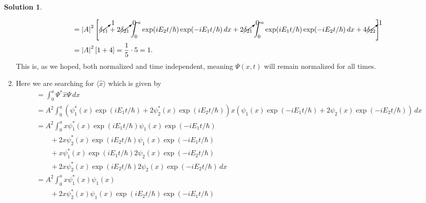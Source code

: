 \documentclass[10pt]{article}
\theoremstyle{definition}
\newtheorem{soln}{Solution}
\begin{document}
\begin{soln}
\begin{enumerate}[label=(\alph*)]
\begin{align*}
             & =\abs{A}^2\left[
              \cancelto{1}{\delta_{11}}
              +2\cancelto{0}{\delta_{21}}\int_{0}^{a}\exp(iE_2t/\hbar)\exp(-iE_1t/\hbar)\,dx
              +2\cancelto{0}{\delta_{21}}\int_{0}^{a}\exp(iE_1t/\hbar)\exp(-iE_2t/\hbar)\,dx
            +4\cancelto{1}{\delta_{22}}\right]                                                                                                                       \\
             & =\abs{A}^2\left[1+4\right]=\frac{1}{5}\cdot 5=1.
          \end{align*}
          This is, as we hoped, both normalized and time independent, meaning $\Psi(x,t)$ will remain normalized for all times.
    \item Here we are searching for $\langle \hat{x}\rangle$ which is given by
          \begin{align*}
             & =\int_{0}^{a}\Psi^*\hat{x}\Psi\,dx                                                                                                                                \\
             & =A^2\int_{0}^{a}(\psi_1^*(x)\exp(iE_1t/\hbar)+2\psi_2^*(x)\exp(iE_2t/\hbar))x(\psi_1(x)\exp(-iE_1t/\hbar)+2\psi_2(x)\exp(-iE_2t/\hbar))\,dx                       \\
             & =A^2\int_{0}^{a}x\psi_1^*(x)\exp(iE_1t/\hbar)\psi_1(x)\exp(-iE_1t/\hbar)                                                                                          \\
             & \qquad+2x\psi_2^*(x)\exp(iE_2t/\hbar)\psi_1(x)\exp(-iE_1t/\hbar)                                                                                                  \\
             & \qquad+x\psi_1^*(x)\exp(iE_1t/\hbar)2\psi_2(x)\exp(-iE_2t/\hbar)                                                                                                  \\
             & \qquad+2x\psi_2^*(x)\exp(iE_2t/\hbar)2\psi_2(x)\exp(-iE_2t/\hbar)\,dx                                                                                             \\
             & =A^2\int_{0}^{a}x\psi_1^*(x)\psi_1(x)                                                                                                                             \\
             & \qquad+2x\psi_2^*(x)\psi_1(x)\exp(iE_2t/\hbar)\exp(-iE_1t/\hbar)                                                                                                  \\

\end{align*}
\end{enumerate}
\end{soln}
\end{document}
